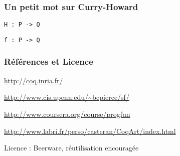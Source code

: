 \documentclass[9pt,handout]{beamer}
\begin{document}
\begin{frame}
\frametitle{Un petit mot sur Curry-Howard}

\huge

\begin{center}
\texttt{H : P -> Q}

\pause
\texttt{f : P -> Q}
\end{center}

\end{frame}



\begin{frame}
\frametitle{Références et Licence}
\maketitle

\url{http://coq.inria.fr/}

\url{http://www.cis.upenn.edu/~bcpierce/sf/}

\url{http://www.coursera.org/course/progfun}

\url{http://www.labri.fr/perso/casteran/CoqArt/index.html}

\medskip
Licence : Beerware, réutilisation encouragée

\end{frame}
\end{document}

